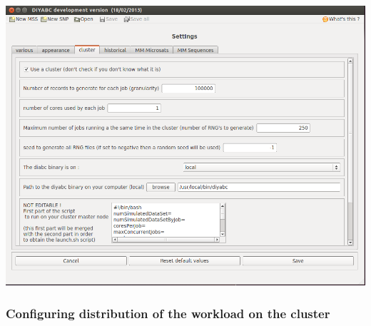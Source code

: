 \includegraphics[scale=0.33]{gui_pictures/Capture-DIYABC-cluster.png} \\

\subsubsection{Configuring distribution of the workload on the cluster}


